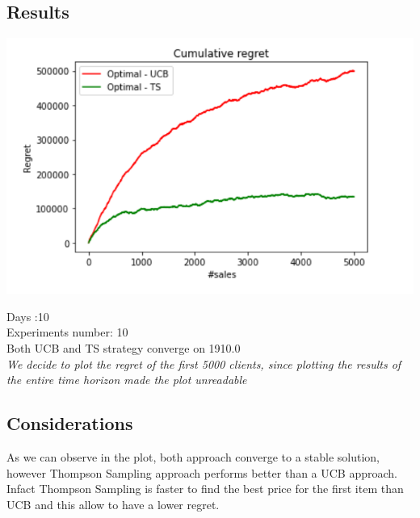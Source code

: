 \subsection*{Results}
\begin{center}
	\includegraphics[scale=1.2]{Images/n3}
\end{center}
Days :10\\
Experiments number: 10 \\
Both UCB and TS strategy converge on 1910.0\\
\textit{We decide to plot the regret of the first 5000 clients, since plotting the results of the entire time horizon made the plot unreadable}


\subsection*{Considerations}
As we can observe in the plot, both approach converge to a stable solution, however Thompson Sampling approach performs better than a UCB approach. Infact Thompson Sampling is faster to find the best price for the first item than UCB and this allow to have a lower regret. 